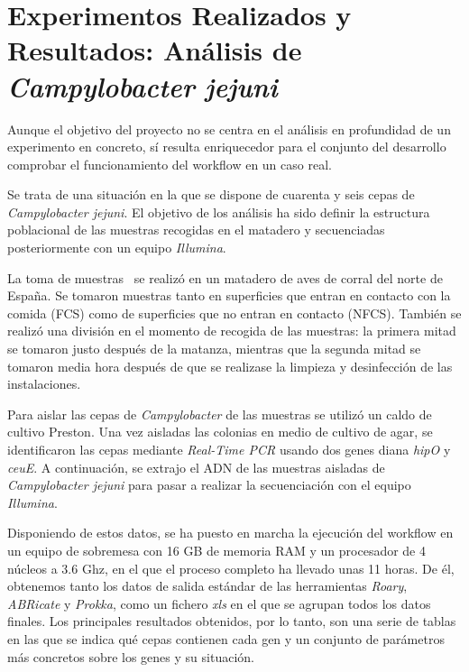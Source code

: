 \chapter{Experimentos Realizados y Resultados: Análisis de \textit{Campylobacter jejuni}}
\label{chap:experimentos}

Aunque el objetivo del proyecto no se centra en el análisis en profundidad de un experimento en concreto, sí resulta enriquecedor para el conjunto del desarrollo comprobar el funcionamiento del workflow en un caso real.

Se trata de una situación en la que se dispone de cuarenta y seis cepas de \textit{Campylobacter jejuni}. El objetivo de los análisis ha sido definir la estructura poblacional de las muestras recogidas en el matadero y secuenciadas posteriormente con un equipo \textit{Illumina}.

La toma de muestras~\cite{garciasanchez2017} se realizó en un matadero de aves de corral del norte de España. Se tomaron muestras tanto en superficies que entran en contacto con la comida (FCS) como de superficies que no entran en contacto (NFCS). También se realizó una división en el momento de recogida de las muestras: la primera mitad se tomaron justo después de la matanza, mientras que la segunda mitad se tomaron media hora después de que se realizase la limpieza y desinfección de las instalaciones.

Para aislar las cepas de \textit{Campylobacter} de las muestras se utilizó un caldo de cultivo Preston. Una vez aisladas las colonias en medio de cultivo de agar, se identificaron las cepas mediante \textit{Real-Time PCR} usando dos genes diana \textit{hipO} y \textit{ceuE}. A continuación, se extrajo el ADN de las muestras aisladas de \textit{Campylobacter jejuni} para pasar a realizar la secuenciación con el equipo \textit{Illumina}.

Disponiendo de estos datos, se ha puesto en marcha la ejecución del workflow en un equipo de sobremesa con 16 GB de memoria RAM y un procesador de 4 núcleos a 3.6 Ghz, en el que el proceso completo ha llevado unas 11 horas. De él, obtenemos tanto los datos de salida estándar de las herramientas \textit{Roary}, \textit{ABRicate} y \textit{Prokka}, como un fichero \textit{xls} en el que se agrupan todos los datos finales. Los principales resultados obtenidos, por lo tanto, son una serie de tablas en las que se indica qué cepas contienen cada gen y un conjunto de parámetros más concretos sobre los genes y su situación.

